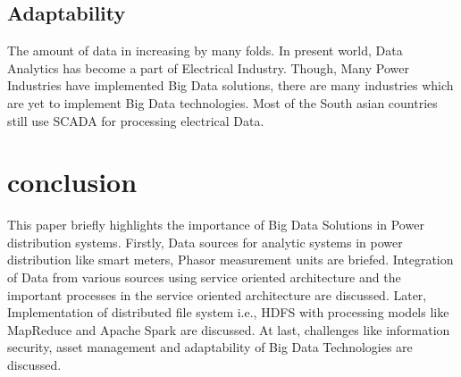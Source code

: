 \documentclass[sigconf]{acmart}
\begin{document}
\subsection{Adaptability}
The amount of data in increasing by many folds. In present world, Data Analytics has become a part of Electrical Industry. Though, Many Power Industries have implemented Big Data solutions, there are many industries which are yet to implement Big Data technologies. Most of the South asian countries still use SCADA for processing electrical Data.\cite{2002}
\section{conclusion}


This paper briefly highlights the importance of Big Data Solutions in Power distribution systems. Firstly, Data sources for analytic systems in power distribution like smart meters, Phasor measurement units are briefed. Integration of Data from various sources using service oriented architecture and the important processes in the service oriented architecture are discussed. Later, Implementation of distributed file system i.e., HDFS with processing models like MapReduce and Apache Spark are discussed. At last, challenges like information security, asset management and adaptability of Big Data Technologies are discussed. 

 


\end{document}
